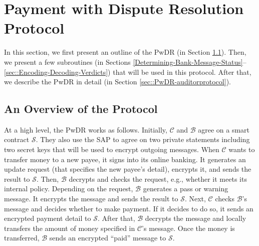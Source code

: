 






\section{Payment with Dispute Resolution Protocol}\label{sec::PwDR-Protocol}

In this section, we first present an outline of the PwDR (in Section \ref{An-Overview-of-the-Protocol}). Then, we present a few subroutines (in Sections \ref{Determining-Bank-Message-Status}--\ref{sec::Encoding-Decoding-Verdicts}) that will be used in this protocol. After that, we describe the PwDR in detail (in Section \ref{sec::PwDR-auditorprotocol}). 

\vspace{-3mm}

\subsection{An Overview of  the  Protocol}\label{An-Overview-of-the-Protocol}

At a high level, the PwDR works as follows. Initially,     $\mathcal{C}$ and   $\mathcal{B}$   agree on a smart contract  $\mathcal{S}$. They also use the SAP to agree on two private statements including two secret keys that will be used to encrypt outgoing messages. When $\mathcal{C}$ wants to transfer money to a new payee, it signs into its online banking.  It generates an update request (that specifies the new payee's detail),  encrypts it, and sends the result to  $\mathcal{S}$. Then, $\mathcal{B}$ decrypts and checks the request, e.g.,  whether it meets its internal policy. Depending on the request, $\mathcal{B}$ generates a pass or warning message. It encrypts the message and sends the result to $\mathcal{S}$. Next, $\mathcal{C}$ checks $\mathcal{B}$'s message and decides whether to make payment. If it decides to do so,  it sends an encrypted payment detail to $\mathcal{S}$. After that, $\mathcal{B}$  decrypts the message and locally transfers the amount of money specified in $\mathcal{C}$'s message. Once the money is transferred, $\mathcal{B}$ sends an encrypted  ``paid'' message to $\mathcal{S}$. 


